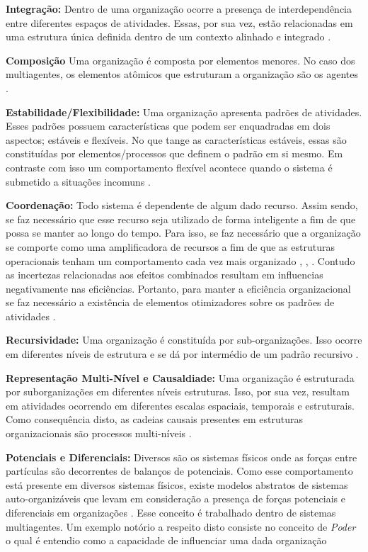 \textbf{Integração:} Dentro de uma organização ocorre a presença de interdependência entre diferentes espaços de atividades. Essas, por sua vez, estão relacionadas em uma estrutura única definida dentro de um contexto alinhado e integrado \cite{organiationofmultiagentsystem}.

\textbf{Composição} Uma organização é composta por elementos menores. No caso dos multiagentes, os elementos atômicos que estruturam a organização são os agentes \cite{organiationofmultiagentsystem}.

\textbf{Estabilidade/Flexibilidade:} Uma organização apresenta padrões de atividades. Esses padrões possuem características que podem ser enquadradas em dois aspectos; estáveis e flexíveis. No que tange as características estáveis, essas são constituídas por elementos/processos que definem o padrão em si mesmo. Em contraste com isso um comportamento flexível acontece quando o sistema é submetido a situações incomuns \cite{organiationofmultiagentsystem}.

\textbf{Coordenação:} Todo sistema é dependente de algum dado recurso. Assim sendo, se faz necessário que esse recurso seja utilizado de forma inteligente a fim de que possa se manter ao longo do tempo. Para isso, se faz necessário que a organização se comporte como uma amplificadora de recursos a fim de que as estruturas operacionais tenham um comportamento cada vez mais organizado \cite{selforganization}, \cite{selforganizatioenvoriment}, \cite{defintionselforganization}. Contudo as incertezas relacionadas aos efeitos combinados resultam em influencias negativamente nas eficiências. Portanto, para manter a eficiência organizacional se faz necessário a existência de elementos otimizadores sobre os padrões de atividades \cite{organiationofmultiagentsystem}.

\textbf{Recursividade:} Uma organização é constituída por sub-organizações. Isso ocorre em diferentes níveis de estrutura e se dá por intermédio de um padrão recursivo \cite{organiationofmultiagentsystem}.

\textbf{Representação Multi-Nível e Causaldiade:} Uma organização é estruturada por suborganizações em diferentes níveis estruturas. Isso, por sua vez, resultam em atividades ocorrendo em diferentes escalas espaciais, temporais e estruturais. Como consequência disto, as cadeias causais presentes em estruturas organizacionais são processos multi-níveis \cite{organiationofmultiagentsystem}.

\textbf{Potenciais e Diferenciais:} Diversos são os sistemas físicos onde as forças entre partículas são decorrentes de balanços de potenciais. Como esse comportamento está presente em diversos sistemas físicos, existe modelos abstratos de sistemas auto-organizáveis que levam em consideração a presença de forças potenciais e diferenciais em organizações \cite{selforganizationdiffforce}. Esse conceito é trabalhado dentro de sistemas multiagentes. Um exemplo notório a respeito disto consiste no conceito de \textit{Poder} o qual é entendio como a capacidade de influenciar uma dada organização \cite{organiationofmultiagentsystem}

